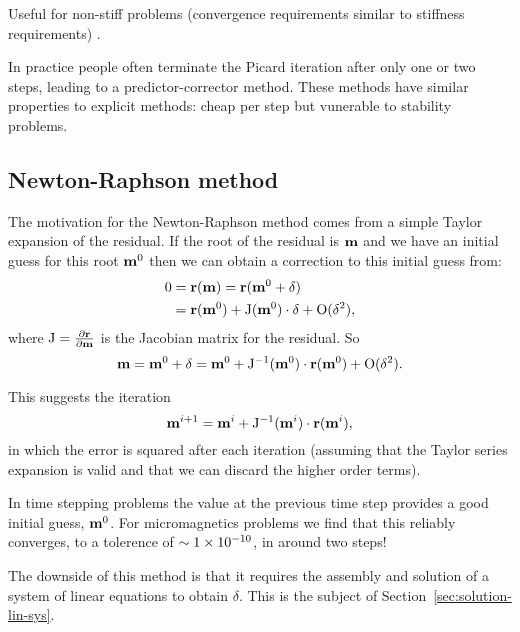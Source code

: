Useful for non-stiff problems (convergence requirements similar to stiffness requirements) \cite{Iserles2009}.

In practice people often terminate the Picard iteration after only one or two steps, leading to a predictor-corrector method. 
These methods have similar properties to explicit methods: cheap per step but vunerable to stability problems.


\subsection{Newton-Raphson method}
\label{sec:newt-raph}

\newcommand{\resi}{\rv}
\newcommand{\jac}{\mathrm{J}}
\newcommand{\nowm}{\mv^0}
\newcommand{\nextm}{\mv}
\newcommand{\corr}{\delta}

The motivation for the Newton-Raphson method comes from a simple Taylor expansion of the residual. If the root of the residual is $\nextm$ and we have an initial guess for this root $\nowm$ then we can obtain a correction to this initial guess from:
\begin{equation}
  \begin{aligned}
    0 &= \resi(\nextm) = \resi(\nowm + \corr) \\
    &= \resi(\nowm) + \jac(\nowm) \cdot \corr + \order{\corr^2},
  \end{aligned}
\end{equation}
where $\jac = \pd{\resi}{\mv}$ is the Jacobian matrix for the residual.
So
\begin{equation}
  \label{eq:49}
  \nextm = \nowm + \corr = \nowm + \jac^{-1}(\nowm) \cdot \resi(\nowm) + \order{\corr^2}.
\end{equation}

This suggests the iteration
\begin{equation}
  \mv^{i+1} = \mv^i + \jac^{-1}(\mv^i) \cdot \resi(\mv^i),
\end{equation}
in which the error is squared after each iteration (assuming that the Taylor series expansion is valid and that we can discard the higher order terms).

In time stepping problems the value at the previous time step provides a good initial guess, $\mathbf{m}^0$.
For micromagnetics problems we find that this reliably converges, to a tolerence of $\sim1\times 10^{-10}$, in around two steps!

The downside of this method is that it requires the assembly and solution of a system of linear equations to obtain $\corr$.
This is the subject of Section~\ref{sec:solution-lin-sys}.


